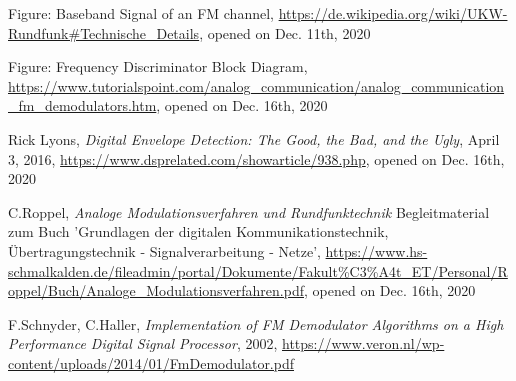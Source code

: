 \documentclass[conference]{IEEEtran}
\begin{document}
\begin{thebibliography}{1}
    Figure: Baseband Signal of an FM channel, \url{https://de.wikipedia.org/wiki/UKW-Rundfunk#Technische_Details}, opened on Dec. 11th, 2020

    Figure: Frequency Discriminator Block Diagram, \url{https://www.tutorialspoint.com/analog_communication/analog_communication_fm_demodulators.htm}, opened on Dec. 16th, 2020

    Rick Lyons, \emph{Digital Envelope Detection: The Good, the Bad, and the Ugly}, April 3, 2016, \url{https://www.dsprelated.com/showarticle/938.php}, opened on Dec. 16th, 2020

    C.Roppel, \emph{Analoge Modulationsverfahren und Rundfunktechnik} Begleitmaterial zum Buch 'Grundlagen der digitalen Kommunikationstechnik, Übertragungstechnik - Signalverarbeitung - Netze', \url{https://www.hs-schmalkalden.de/fileadmin/portal/Dokumente/Fakult%C3%A4t_ET/Personal/Roppel/Buch/Analoge_Modulationsverfahren.pdf}, opened on Dec. 16th, 2020

    F.Schnyder, C.Haller, \emph{Implementation of FM Demodulator
    Algorithms on a High Performance Digital Signal Processor}, 2002, \url{https://www.veron.nl/wp-content/uploads/2014/01/FmDemodulator.pdf}
\end{thebibliography}




\end{document}
